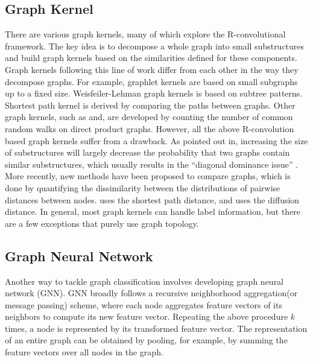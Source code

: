 \documentclass[11pt,onecolumn]{article}
\begin{document}
\subsection{Graph Kernel}
There are various graph kernels, many of which explore the R-convolutional framework\cite{haussler1999convolution}. The key idea is to decompose a whole graph into small substructures and build graph kernels based on the similarities defined for these components. Graph kernels following this line of work differ from each other in the way they decompose graphs. For example, graphlet kernels\cite{shervashidze2009efficient} are based on small subgraphs up to a fixed size. Weisfeiler-Lehman graph kernels\cite{shervashidze2011weisfeiler} is based on subtree patterns. Shortest path kernel\cite{borgwardt2005shortest} is derived by comparing the paths between graphs.  Other graph kernels, such as\cite{vishwanathan2010graph} and\cite{gartner2003graph}, are developed by counting the number of common random walks on direct product graphs. However, all the above R-convolution based graph kernels suffer from a drawback. As pointed out in\cite{yanardag2015structural}, increasing the size of substructures will largely decrease the probability that two graphs contain similar substructures, which usually results in the ``diagonal dominance issue'' \cite{kandola2003reducing}.  More recently, new methods have been proposed to compare graphs, which is done by quantifying the dissimilarity between the distributions of pairwise distances between nodes. \cite{schieber2017quantification} uses the shortest path distance, and\cite{verma2017hunt} uses the diffusion distance. In general, most graph kernels can handle label information, but there are a few exceptions\cite{shervashidze2009efficient, verma2017hunt} that purely use graph topology.

\subsection{Graph Neural Network}
Another way to tackle graph classification involves developing graph neural network (GNN). GNN broadly follows a recursive neighborhood aggregation(or message passing) scheme, where each node aggregates feature vectors of its neighbors to compute its new feature vector. Repeating the above procedure $k$ times, a node is represented by its transformed feature vector. The representation of an entire graph can be obtained by pooling, for example, by summing the feature vectors over all nodes in the graph. 
\end{document}
